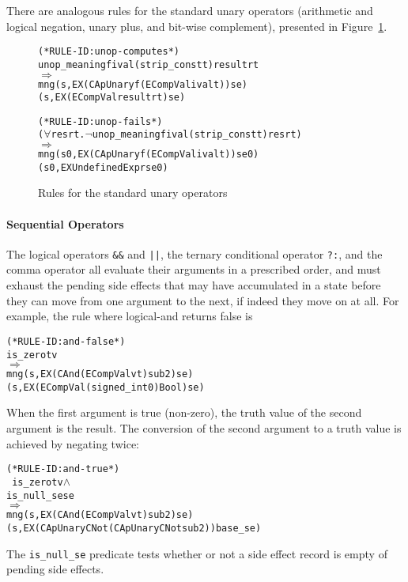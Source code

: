 \documentclass[11pt]{article}
\begin{document}
There are analogous rules for the standard unary operators (arithmetic
and logical negation, unary plus, and bit-wise complement), presented
in Figure~\ref{fig:capunary-rules}. 
\begin{figure}[htbp]
\begin{alltt}
(* RULE-ID: unop-computes *)
     unop_meaning f ival (strip_const t) result rt
   \(\Rightarrow\)
     mng (s, EX (CApUnary f (ECompVal ival t)) se) 
         (s, EX (ECompVal result rt) se)
\end{alltt}

\begin{alltt}
(* RULE-ID: unop-fails *)
     (\(\forall\)res rt. \(\neg\)unop_meaning f ival (strip_const t) res rt)
   \(\Rightarrow\)
     mng (s0, EX (CApUnary f (ECompVal ival t)) se0) 
         (s0, EX UndefinedExpr se0)
\end{alltt}
\caption{Rules for the standard unary operators}
\label{fig:capunary-rules}
\end{figure}

\paragraph{Sequential Operators}
The logical operators \texttt{\&\&} and \texttt{||}, the ternary
conditional operator \texttt{?:}, and the comma operator all evaluate
their arguments in a prescribed order, and must exhaust the pending
side effects that may have accumulated in a state before they can move
from one argument to the next, if indeed they move on at all.   For
example, the rule where logical-and returns false is 
\begin{alltt}
(* RULE-ID: and-false *)
     is_zero t v
   \(\Rightarrow\)
     mng (s, EX (CAnd (ECompVal v t) sub2) se) 
         (s, EX (ECompVal (signed_int 0) Bool) se)
\end{alltt}
When the first argument is true (non-zero), the truth value of the
second argument is the result.  The conversion of the second argument
to a truth value is achieved by negating twice:
\begin{alltt}
(* RULE-ID: and-true *)
     ~is_zero t v \(\land\)
     is_null_se se
   \(\Rightarrow\)
     mng (s, EX (CAnd (ECompVal v t) sub2) se) 
         (s, EX (CApUnary CNot (CApUnary CNot sub2)) base_se)
\end{alltt}
The \texttt{is_null_se} predicate tests whether or not a side effect
record is empty of pending side effects. 
\end{document}
